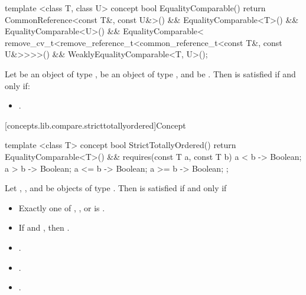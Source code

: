 %
\begin{itemdecl}
template <class T, class U>
concept bool EqualityComparable() {
  return CommonReference<const T&, const U&>() &&
    EqualityComparable<T>() &&
    EqualityComparable<U>() &&
    EqualityComparable<
      remove_cv_t<remove_reference_t<common_reference_t<const T&, const U&>>>>() &&
    WeaklyEqualityComparable<T, U>();
}
\end{itemdecl}

\begin{itemdescr}
\pnum
Let  be an object of type ,  be an object of type , and  be
.
Then 
is satisfied if and only if:

\begin{itemize}
\item {}.
\end{itemize}
\end{itemdescr}

[concepts.lib.compare.stricttotallyordered]{Concept }

%
\begin{itemdecl}
template <class T>
concept bool StrictTotallyOrdered() {
  return EqualityComparable<T>() &&
    requires(const T a, const T b) {
      { a < b } -> Boolean;
      { a > b } -> Boolean;
      { a <= b } -> Boolean;
      { a >= b } -> Boolean;
    };
}
\end{itemdecl}

\begin{itemdescr}
\pnum
Let , , and  be objects of type .
Then  is satisfied if and only if

\begin{itemize}
\item Exactly one of , , or
       is .
\item If  and , then
      .
\item {}.
\item {}.
\item {}.
\end{itemize}

\end{itemdescr}

